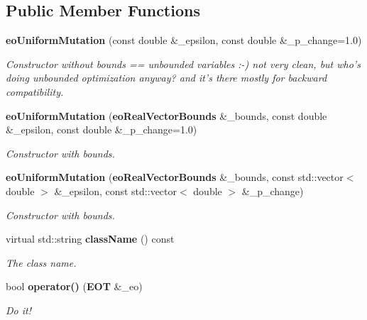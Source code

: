 \subsection*{Public Member Functions}
\begin{CompactItemize}
\item 
{\bf eo\-Uniform\-Mutation} (const double \&\_\-epsilon, const double \&\_\-p\_\-change=1.0)
\begin{CompactList}\small\item\em Constructor without bounds == unbounded variables :-) not very clean, but who's doing unbounded optimization anyway? and it's there mostly for backward compatibility. \item\end{CompactList}\item 
{\bf eo\-Uniform\-Mutation} ({\bf eo\-Real\-Vector\-Bounds} \&\_\-bounds, const double \&\_\-epsilon, const double \&\_\-p\_\-change=1.0)
\begin{CompactList}\small\item\em Constructor with bounds. \item\end{CompactList}\item 
{\bf eo\-Uniform\-Mutation} ({\bf eo\-Real\-Vector\-Bounds} \&\_\-bounds, const std::vector$<$ double $>$ \&\_\-epsilon, const std::vector$<$ double $>$ \&\_\-p\_\-change)
\begin{CompactList}\small\item\em Constructor with bounds. \item\end{CompactList}\item 
virtual std::string {\bf class\-Name} () const \label{classeo_uniform_mutation_a3}

\begin{CompactList}\small\item\em The class name. \item\end{CompactList}\item 
bool {\bf operator()} ({\bf EOT} \&\_\-eo)
\begin{CompactList}\small\item\em Do it! \item\end{CompactList}\end{CompactItemize}
